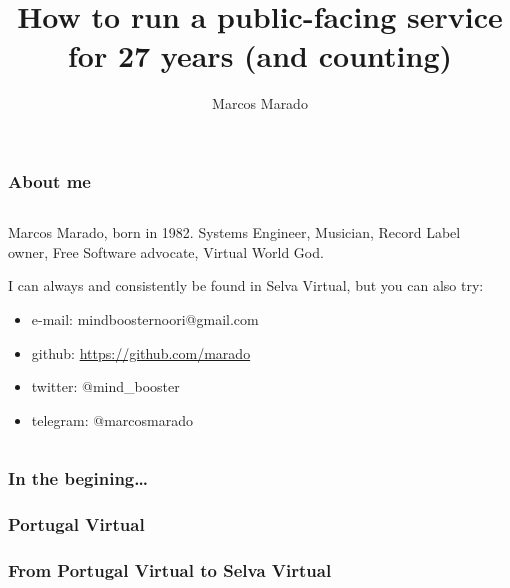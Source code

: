 \documentclass[aspectratio=169]{beamer}
\title{How to run a public-facing service for 27 years (and counting)}
\author{Marcos Marado}
\begin{document}
\frame[plain]{\titlepage}
 
\begin{frame}
\frametitle{About me}
\begin{columns}[T]
\begin{column}{.5\textwidth}
\begin{block}{Marcos Marado, born in 1982. Systems Engineer, Musician, Record Label owner, Free Software advocate, Virtual World God.}

I can always and consistently be found in Selva Virtual, but you can also try:

\begin{itemize}
\item{} e-mail: mindboosternoori@gmail.com
\item{} github: \url{https://github.com/marado}
\item{} twitter: @mind\_booster
\item{} telegram: @marcosmarado
\end{itemize}
\end{block}
\end{column}
\begin{column}{.5\textwidth}
\begin{center}





\end{center}
\end{column}
\end{columns}
\end{frame}

\begin{frame}
\frametitle{In the begining\ldots}

\end{frame}

\begin{frame}
\frametitle{Portugal Virtual}

\end{frame}

\begin{frame}
\frametitle{From Portugal Virtual to Selva Virtual}

\end{frame}
\end{document}
